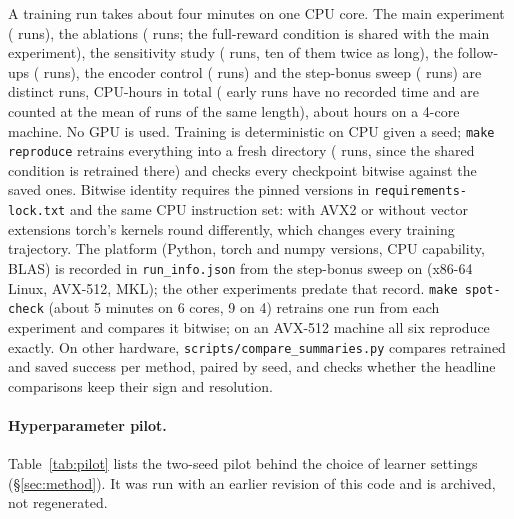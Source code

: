 A training run takes about four minutes on one CPU core. The main experiment ( runs), the ablations ( runs; the full-reward condition is shared with the main experiment), the sensitivity study ( runs, ten of them twice as long), the follow-ups ( runs), the encoder control ( runs) and the step-bonus sweep ( runs) are  distinct runs,  CPU-hours in total ( early runs have no recorded time and are counted at the mean of runs of the same length), about  hours on a 4-core machine. No GPU is used. Training is deterministic on CPU given a seed; \texttt{make reproduce} retrains everything into a fresh directory ( runs, since the shared condition is retrained there) and checks every checkpoint bitwise against the saved ones. Bitwise identity requires the pinned versions in \texttt{requirements-lock.txt} and the same CPU instruction set: with AVX2 or without vector extensions torch's kernels round differently, which changes every training trajectory. The platform (Python, torch and numpy versions, CPU capability, BLAS) is recorded in \texttt{run\_info.json} from the step-bonus sweep on (x86-64 Linux, AVX-512, MKL); the other experiments predate that record. \texttt{make spot-check} (about 5 minutes on 6 cores, 9 on 4) retrains one run from each experiment and compares it bitwise; on an AVX-512 machine all six reproduce exactly. On other hardware, \texttt{scripts/compare\_summaries.py} compares retrained and saved success per method, paired by seed, and checks whether the headline comparisons keep their sign and resolution.

\paragraph{Hyperparameter pilot.}
Table~\ref{tab:pilot} lists the two-seed pilot behind the choice of learner settings (\S\ref{sec:method}). It was run with an earlier revision of this code and is archived, not regenerated.

\begin{table}[H]
\centering
\small
\setlength{\tabcolsep}{4pt}
\caption{Hyperparameter pilot (2 seeds, selected checkpoints). The setting used throughout is learning rate $10^{-3}$ with a hard target update every 200 steps.}
\label{tab:pilot}

\end{table}

